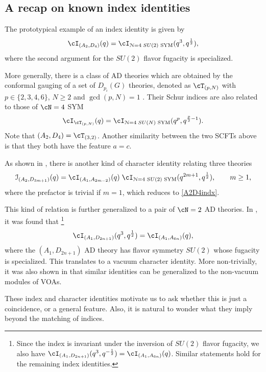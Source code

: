 \documentclass[a4paper,11pt]{article}
\theoremstyle{definition}
\theoremstyle{definition}
\theoremstyle{remark}
\newcommand{\be}{\begin{equation}}
\newcommand{\ee}{\end{equation}}
\begin{document}
 

 \subsection{A recap on known   index identities}
 
 The  prototypical example of an index identity  is given by  \cite{Buican:2020moo}
 \be\label{A2D4indx}
 \cI_{(A_2,D_4)}(q)=\cI_{\mathcal{N}=4\;SU(2)  \text{  SYM}}(q^{3}, q^{\frac{1}{2} }),
 \ee
where the second argument for the $SU(2) $ flavor fugacity is specialized. 

More generally,   there is a class of AD theories which are obtained by the conformal gauging of a set of $D_{p_i}(G)$ theories,   denoted as $\cT_{(p,N)}$ with  $p\in\{2,3,4,6\}$, $N\geq2$ and $\gcd(p,N)=1$ \cite{Buican:2020moo,Jiang:2024baj}. Their Schur indices are also related to those of $\cN=4$ SYM 
%
\be\label{TpNindex}
\cI_{\cT_{(p,N)}}(q)=\cI_{\mathcal{N}=4 \; SU(N)  \text{  SYM}}(q^{p}, q^{\frac{p}{2}-1}).
\ee
 Note that $(A_2,D_4)=\cT_{(3,2)}$. Another similarity between the two SCFTs above is that they both   have the feature $a=c$.

 



As shown in \cite{Jiang:2026keq,Yoshida:2026ugm}, there is   another kind of character identity relating   three theories
  \be
\mathcal{I} _{(A_2,D_{3m+1})}(q) = \cI_{(A_1,A_{2m-2})} (q)\; \cI_{\mathcal{N}=4\;SU(2)\text{ SYM}}(q^{2m+1}, q^{\frac{1}{2}}),\qquad m\ge1,
\ee 
where the prefactor  is trivial if $m=1$, which reduces to \eqref{A2D4indx}.


 This kind of relation is further generalized to a pair of $\cN=2$ AD theories. In \cite{Adamovic:2025efe}, it was found that 
 \footnote{Since the index is invariant under the inversion of $SU(2)$ flavor fugacity, we also have $\cI_{(A_{1},D_{2n+1})}(q^3,q^{-\frac12})=\cI_{(A_1,A_{6n})} (q)$. Similar statements hold for the remaining index identities.}
 \be
\cI_{(A_{1},D_{2n+1})}(q^3,q^{\frac12})=\cI_{(A_1,A_{6n})} (q),
\ee
where the  $(A_{1},D_{2n+1})$ AD theory has flavor symmetry $SU(2)$ whose fugacity is specialized. 
This translates to a  vacuum character identity. 
More non-trivially, it was also shown in     \cite{Adamovic:2025efe}   that similar identities can be generalized to the non-vacuum modules of VOAs. 



These index and character identities motivate us to ask whether this is just a coincidence, or a general feature. Also, it is natural to wonder what  they imply beyond the matching of indices.
\end{document}
